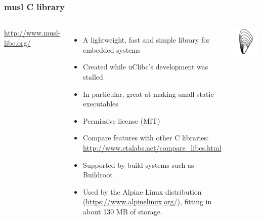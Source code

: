 \begin{frame}
  \frametitle{musl C library}
  \begin{columns}
      \url{http://www.musl-libc.org/}
      \begin{itemize}
      \item A lightweight, fast and simple library for embedded systems
      \item Created while uClibc's development was stalled
      \item In particular, great at making small static executables
      \item Permissive license (MIT)
      \item Compare features with other C libraries:
        \url{http://www.etalabs.net/compare_libcs.html}
      \item Supported by build systems such as Buildroot
      \item Used by the Alpine Linux distribution
        (\url{https://www.alpinelinux.org/}), fitting in about 130 MB of storage.
      \end{itemize}
    \includegraphics[width=\textwidth]{slides/c-libraries/musl.png}
  \end{columns}
\end{frame}

